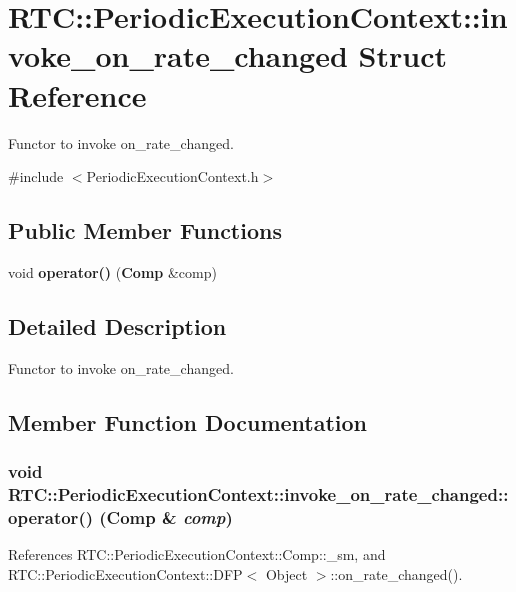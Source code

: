 \section{RTC::PeriodicExecutionContext::invoke\_\-on\_\-rate\_\-changed Struct Reference}
\label{structRTC_1_1PeriodicExecutionContext_1_1invoke__on__rate__changed}


Functor to invoke on\_\-rate\_\-changed.  




{\ttfamily \#include $<$PeriodicExecutionContext.h$>$}

\subsection*{Public Member Functions}
\begin{DoxyCompactItemize}
\item 
void {\bf operator()} ({\bf Comp} \&comp)
\end{DoxyCompactItemize}


\subsection{Detailed Description}
Functor to invoke on\_\-rate\_\-changed. 

\subsection{Member Function Documentation}
\subsubsection[{operator()}]{\setlength{\rightskip}{0pt plus 5cm}void RTC::PeriodicExecutionContext::invoke\_\-on\_\-rate\_\-changed::operator() ({\bf Comp} \& {\em comp})\hspace{0.3cm}{\ttfamily  [inline]}}\label{structRTC_1_1PeriodicExecutionContext_1_1invoke__on__rate__changed_a374c72b2f2d5fa61d9eb6e3476731959}


References RTC::PeriodicExecutionContext::Comp::\_\-sm, and RTC::PeriodicExecutionContext::DFP$<$ Object $>$::on\_\-rate\_\-changed().

